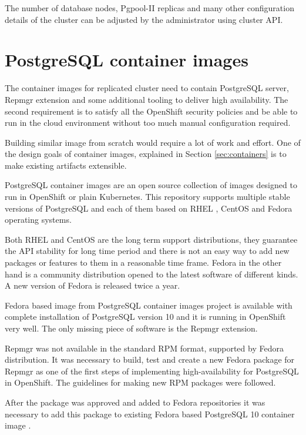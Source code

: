 \documentclass[
  digital, %
  twoside, %
  table,   %
  lof,     %
  lot,     %
]{fithesis3}
\begin{document}
The number of database nodes, Pgpool-II replicas and many other configuration details of the cluster can be adjusted by the administrator using cluster API.

\section{PostgreSQL container images} \label{sec:pg_cnt_images}
The container images for replicated cluster need to contain PostgreSQL server, Repmgr extension and some additional tooling to deliver high availability. The second requirement is to satisfy all the OpenShift security policies and be able to run in the cloud environment without too much manual configuration required.

Building similar image from scratch would require a lot of work and effort. One of the design goals of container images, explained in Section \ref{sec:containers} is to make existing artifacts extensible.

PostgreSQL container images \cite{pg_cnt} are an open source collection of images designed to run in OpenShift or plain Kubernetes. This repository supports multiple stable versions of PostgreSQL and each of them based on RHEL \cite{rhel}, CentOS \cite{centos} and Fedora \cite{getfedora} operating systems.

Both RHEL and CentOS are the long term support distributions, they guarantee the API stability for long time period and there is not an easy way to add new packages or features to them in a reasonable time frame. Fedora in the other hand is a community distribution opened to the latest software of different kinds. A new version of Fedora is released twice a year.

Fedora based image from PostgreSQL container images project is available with complete installation of PostgreSQL version 10 and it is running in OpenShift very well. The only missing piece of software is the Repmgr extension.

Repmgr was not available in the standard RPM \cite{rpm} format, supported by Fedora distribution. It was necessary to build, test and create a new Fedora package for Repmgr \cite{fedora_repmgr} as one of the first steps of implementing high-availability for PostgreSQL in OpenShift. The guidelines for making new RPM packages \cite{fedora_new_package} were followed.

After the package was approved and added to Fedora repositories \cite{fedora_repositories} it was necessary to add this package to existing Fedora based PostgreSQL 10 container image \cite{pg_img}.
\end{document}
